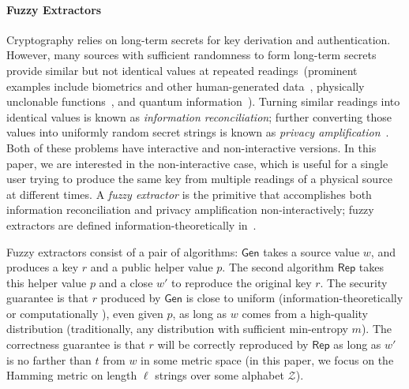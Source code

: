 \documentclass[11pt]{article}
\newcommand{\class}[1]{{\ensuremath{\mathsf{#1}}}}
\newcommand{\gen}{\ensuremath{\class{Gen}}\xspace}
\newcommand{\rep}{\ensuremath{\class{Rep}}\xspace}
\begin{document}
\paragraph{Fuzzy Extractors}
Cryptography relies on long-term secrets for key derivation and authentication. However, many sources with sufficient randomness to form long-term secrets provide similar but not identical values at repeated readings~(prominent examples include biometrics and other human-generated data~\cite{daugman2004,zviran1993comparison,brostoff2000passfaces,ellison2000protecting,mayrhofer2009shake,monrose2002password},
physically unclonable functions~\cite{pappu2002physical,tuyls2006puf,gassend2002silicon,suh2007physical},
and quantum information~\cite{bennett1988privacy}). Turning similar readings into identical values is known as \emph{information reconciliation}; further converting those values into uniformly random secret strings is known as \emph{privacy amplification}~\cite{bennett1988privacy}.
Both of these problems have interactive and non-interactive versions.  In this paper, we are interested in the non-interactive case, which is useful for a single user trying to produce the same key from multiple readings of a physical source at different times.
 A \emph{fuzzy extractor} is the primitive that accomplishes both information reconciliation and privacy amplification non-interactively; fuzzy extractors are defined information-theoretically in~\cite{DBLP:journals/siamcomp/DodisORS08}.


Fuzzy extractors consist of a pair of algorithms: \gen takes a source value $w$, and produces a key $r$ and a public helper value $p$.  The second algorithm \rep takes this helper value $p$ and a close $w'$ to reproduce the original key $r$.  The security guarantee is that $r$ produced by \gen is close to uniform (information-theoretically \cite{DBLP:journals/siamcomp/DodisORS08} or computationally \cite{fuller2013computational}), even given $p$, as long as $w$ comes from a high-quality distribution (traditionally, any distribution with sufficient min-entropy $m$). The correctness guarantee is that $r$ will be correctly reproduced by \rep as long as $w'$ is no farther than $t$ from $w$ in some metric space (in this paper, we focus on the Hamming metric on length $\ell$ strings over some alphabet $\mathcal{Z}$).
\end{document}
